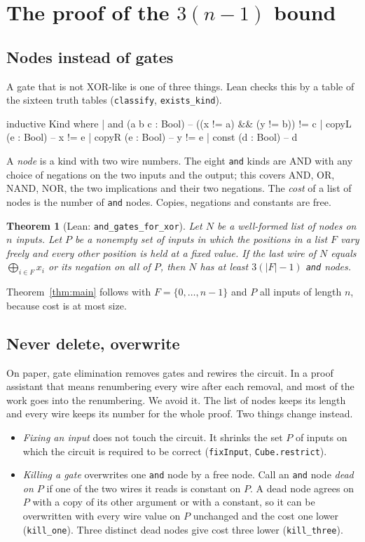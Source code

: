 \documentclass[11pt]{amsart}
\newtheorem{theorem}{Theorem}
\theoremstyle{definition}
\theoremstyle{remark}
\newcommand{\lean}[1]{\texttt{#1}}
\begin{document}
\section{The proof of the $3(n-1)$ bound}

\subsection{Nodes instead of gates}
A gate that is not XOR-like is one of three things. Lean checks this by a table of the sixteen
truth tables (\lean{classify}, \lean{exists\_kind}).

\begin{leancode}
inductive Kind where
  | and (a b c : Bool)   -- ((x != a) && (y != b)) != c
  | copyL (e : Bool)     -- x != e
  | copyR (e : Bool)     -- y != e
  | const (d : Bool)     -- d
\end{leancode}

A \emph{node} is a kind with two wire numbers. The eight \lean{and} kinds are AND with any
choice of negations on the two inputs and the output; this covers AND, OR, NAND, NOR, the
two implications and their two negations. The \emph{cost} of a list of nodes is the number of \lean{and} nodes. Copies,
negations and constants are free.

\begin{theorem}[Lean: \lean{and\_gates\_for\_xor}]\label{thm:and}
Let $N$ be a well-formed list of nodes on $n$ inputs. Let $P$ be a nonempty set of inputs in which the
positions in a list $F$ vary freely and every other position is held at a fixed value. If the
last wire of $N$ equals $\bigoplus_{i\in F}x_i$ or its negation on all of $P$, then
$N$ has at least $3(|F|-1)$ \lean{and} nodes.
\end{theorem}

Theorem~\ref{thm:main} follows with $F=\{0,\dots,n-1\}$ and $P$ all inputs of length $n$,
because cost is at most size.

\subsection{Never delete, overwrite}
On paper, gate elimination removes gates and rewires the circuit. In a proof assistant that
means renumbering every wire after each removal, and most of the work goes into the
renumbering. We avoid it. The list of nodes keeps its length and every wire keeps its number
for the whole proof. Two things change instead.
\begin{itemize}
\item \emph{Fixing an input} does not touch the circuit. It shrinks the set $P$ of inputs on
  which the circuit is required to be correct (\lean{fixInput}, \lean{Cube.restrict}).
\item \emph{Killing a gate} overwrites one \lean{and} node by a free node. Call an \lean{and}
  node \emph{dead on $P$} if one of the two wires it reads is constant on $P$. A dead node
  agrees on $P$ with a copy of its other argument or with a constant, so it can be overwritten
  with every wire value on $P$ unchanged and the cost one lower (\lean{kill\_one}). Three
  distinct dead nodes give cost three lower (\lean{kill\_three}).
\end{itemize}
\end{document}
